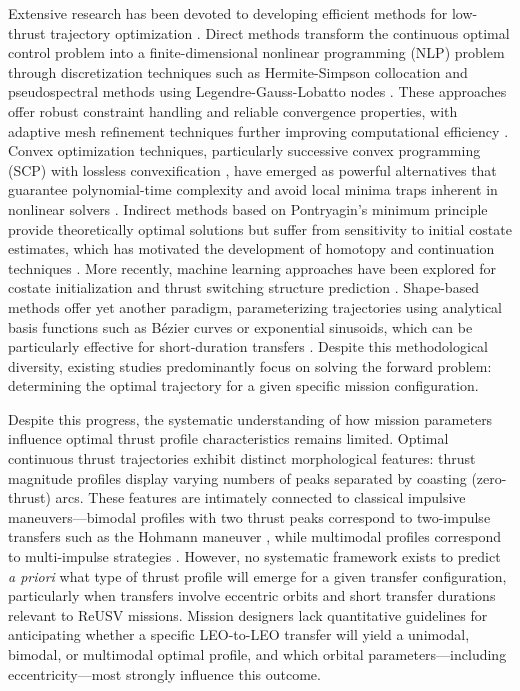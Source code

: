\documentclass[a4paper,fleqn]{cas-dc}
\begin{document}
Extensive research has been devoted to developing efficient methods for low-thrust trajectory optimization \citep{Betts1998,Conway2010}. Direct methods transform the continuous optimal control problem into a finite-dimensional nonlinear programming (NLP) problem through discretization techniques such as Hermite-Simpson collocation \citep{Herman1996,Hargraves1987} and pseudospectral methods using Legendre-Gauss-Lobatto nodes \citep{Rao2025,Fahroo2002}. These approaches offer robust constraint handling and reliable convergence properties, with adaptive mesh refinement techniques further improving computational efficiency \citep{Patterson2014}. Convex optimization techniques, particularly successive convex programming (SCP) with lossless convexification \citep{Acikmese2013,Blackmore2012}, have emerged as powerful alternatives that guarantee polynomial-time complexity and avoid local minima traps inherent in nonlinear solvers \citep{Mao2017,Malyuta2022}. Indirect methods based on Pontryagin's minimum principle \citep{Pontryagin1962} provide theoretically optimal solutions but suffer from sensitivity to initial costate estimates, which has motivated the development of homotopy and continuation techniques \citep{Bertrand2002,Caillau2012}. More recently, machine learning approaches have been explored for costate initialization and thrust switching structure prediction \citep{Izzo2019,Zaidi2023}. Shape-based methods offer yet another paradigm, parameterizing trajectories using analytical basis functions such as B\'{e}zier curves \citep{Lee2021bezier} or exponential sinusoids, which can be particularly effective for short-duration transfers \citep{Lee2025eucass}. Despite this methodological diversity, existing studies predominantly focus on solving the forward problem: determining the optimal trajectory for a given specific mission configuration.

Despite this progress, the systematic understanding of how mission parameters influence optimal thrust profile characteristics remains limited. Optimal continuous thrust trajectories exhibit distinct morphological features: thrust magnitude profiles display varying numbers of peaks separated by coasting (zero-thrust) arcs. These features are intimately connected to classical impulsive maneuvers---bimodal profiles with two thrust peaks correspond to two-impulse transfers such as the Hohmann maneuver \citep{Hohmann1960}, while multimodal profiles correspond to multi-impulse strategies \citep{Edelbaum1967}. However, no systematic framework exists to predict \textit{a priori} what type of thrust profile will emerge for a given transfer configuration, particularly when transfers involve eccentric orbits and short transfer durations relevant to ReUSV missions. Mission designers lack quantitative guidelines for anticipating whether a specific LEO-to-LEO transfer will yield a unimodal, bimodal, or multimodal optimal profile, and which orbital parameters---including eccentricity---most strongly influence this outcome.
\end{document}
